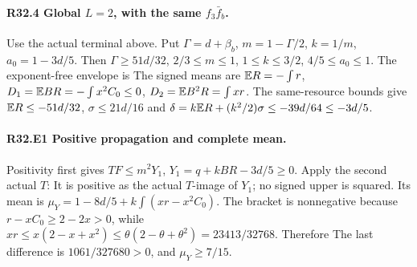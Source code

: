 \paragraph{R32.4 Global \(L=2\), with the same \(f_3\bar f_b\).}
Use the actual terminal above. Put
\(\Gamma=d+\beta_b\), \(m=1-\Gamma/2\), \(k=1/m\), \(a_0=1-3d/5\).
Then \(\Gamma\ge51d/32\), \(2/3\le m\le1\), \(1\le k\le3/2\),
\(4/5\le a_0\le1\). The exponent-free envelope is
The signed means are \(\mathbb E R=-\int r\),
\(D_1=\mathbb E BR=-\int x^2C_0\le0\), \(D_2=\mathbb E B^2R=\int xr\).
The same-resource bounds give \(\mathbb E R\le-51d/32\), \(\sigma\le21d/16\)
and \(\delta=k\mathbb E R+(k^2/2)\sigma\le-39d/64\le-3d/5\).

\paragraph{R32.E1 Positive propagation and complete mean.}
Positivity first gives \(TF\le m^2Y_1\),
\(Y_1=q+kBR-3d/5\ge0\). Apply the second actual \(T\):
It is positive as the actual \(T\)-image of \(Y_1\); no signed upper is
squared. Its mean is
\(\mu_Y=1-8d/5+k\int(xr-x^2C_0)\). The bracket is nonnegative because
\(r-xC_0\ge2-2x>0\), while
\(xr\le x(2-x+x^2)\le\theta(2-\theta+\theta^2)=23413/32768\).
Therefore
The last difference is \(1061/327680>0\), and \(\mu_Y\ge7/15\).

